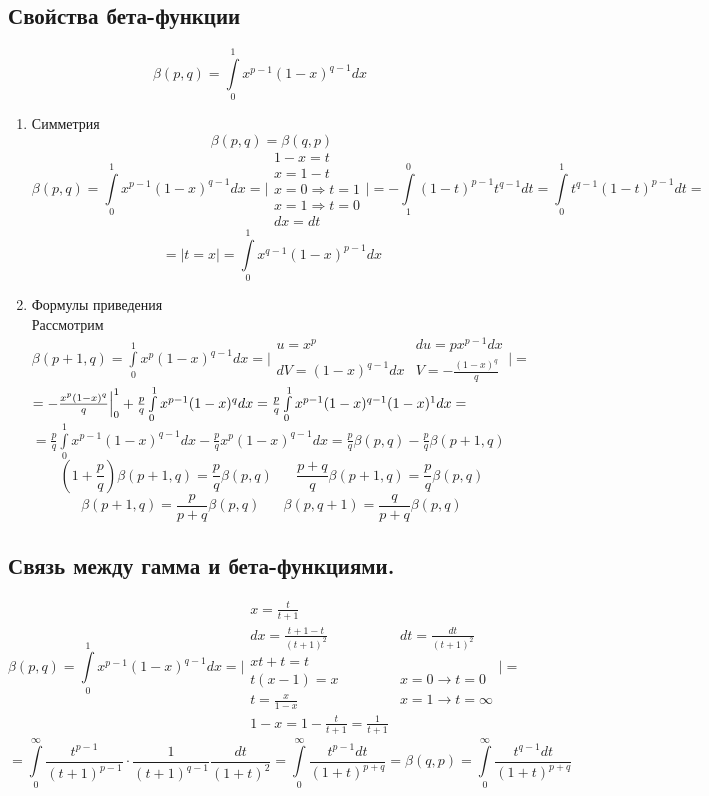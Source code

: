 \documentclass[12pt]{article}
\let\oldint\int
\renewcommand{\int}{\oldint\limits}
\begin{document}
    \subsection{Свойства бета-функции}
    \[ \beta(p,q)=\int_{0}^{1}x^{p-1}(1-x)^{q-1}dx\]
    \begin{enumerate}
      \item Симметрия\\
      \[\beta(p,q)=\beta(q,p)\]
      \[\beta(p,q)=\int_{0}^{1}x^{p-1}(1-x)^{q-1}dx 
      = \Bigg| 
      \begin{matrix}
        1-x=t\\
        x=1-t\\
        x=0 \Rightarrow t=1\\
        x=1 \Rightarrow t=0\\
        dx=dt
      \end{matrix}
      \Bigg|=
      -\int_{1}^{0}(1-t)^{p-1}t^{q-1}dt=\int_{0}^{1}t^{q-1}(1-t)^{p-1}dt=\]
      \[= |t=x|=\int_{0}^{1}x^{q-1}(1-x)^{p-1}dx\]

      \item Формулы приведения\\
      Рассмотрим $\beta(p+1,q)=\int_{0}^{1}x^p(1-x)^{q-1}dx=
      \Bigg| 
      \begin{matrix}
        u=x^p & du=px^{p-1}dx\\
        dV=(1-x)^{q-1}dx & V=-\frac{(1-x)^q}{q}
      \end{matrix}
      \Bigg|=$\\
      $=-\frac{x^p(1-x)^q}{q}\Big|^1_0+ \frac{p}{q}\int_{0}^{1}x^{p-1}(1-x)^qdx=\frac{p}{q}
      \int_{0}^{1}x^{p-1}(1-x)^{q-1}(1-x)^1dx=\\$
      $=\frac{p}{q}\int_{0}^{1}x^{p-1}(1-x)^{q-1}dx-\frac{p}{q}x^p(1-x)^{q-1}dx=\frac{p}{q}\beta(p,q)-
      \frac{p}{q}\beta(p+1,q)$
      \[(1+\frac{p}{q})\beta(p+1,q)=\frac{p}{q}\beta(p,q) \hspace{20pt} \frac{p+q}{q}\beta(p+1,q)=\frac{p}{q}\beta(p,q)\]
      \[\boxed{\beta(p+1,q)=\frac{p}{p+q}\beta(p,q)} \hspace{20pt} \boxed{\beta(p,q+1)=\frac{q}{p+q}\beta(p,q)}\]
    \end{enumerate}

    \subsection{Связь между гамма и бета-функциями.}
    \[\beta(p,q)=\int_{0}^{1}x^{p-1}(1-x)^{q-1}dx = 
    \Bigg|
    \begin{matrix}
      x=\frac{t}{t+1}\\
      dx=\frac{t+1-t}{(t+1)^2} & dt=\frac{dt}{(t+1)^2}\\
      xt+t=t\\
      t(x-1)=x & x=0 \rightarrow t=0\\
      t=\frac{x}{1-x} & x=1 \rightarrow t= \infty\\
      1-x=1-\frac{t}{t+1}=\frac{1}{t+1}
    \end{matrix}
    \Bigg|
    =\]
    \[=\int_{0}^{\infty}\frac{t^{p-1}}{(t+1)^{p-1}}\cdot \frac{1}{(t+1)^{q-1}}\frac{dt}{(1+t)^2}=
    \int_{0}^{\infty}\frac{t^{p-1}dt}{(1+t)^{p+q}}=\beta(q,p)=\int_{0}^{\infty}\frac{t^{q-1}dt}{(1+t)^{p+q}}\]
\end{document}
